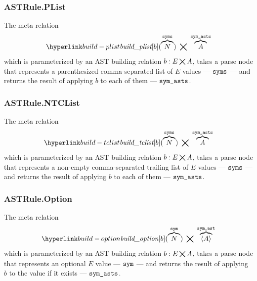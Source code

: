 \subsubsection{ASTRule.PList \label{sec:ASTRule.PList}}
\hypertarget{build-plist}{}
The meta relation
\[
\buildplist[b](\overname{N}{\vsyms}) \;\aslrel\; \overname{A}{\vsymasts}
\]
which is parameterized by an AST building relation $b : E \aslrel A$,
takes a parse node that represents a parenthesized comma-separated list of $E$ values --- $\vsyms$ --- and returns the result of applying $b$
to each of them --- $\vsymasts$.

\begin{mathpar}
\end{mathpar}

\subsubsection{ASTRule.NTCList \label{sec:ASTRule.NTCList}}
\hypertarget{build-tclist}{}
The meta relation
\[
\buildtclist[b](\overname{N}{\vsyms}) \;\aslrel\; \overname{A}{\vsymasts}
\]
which is parameterized by an AST building relation $b : E \aslrel A$,
takes a parse node that represents a non-empty comma-separated trailing list of $E$ values --- $\vsyms$ --- and returns the result of applying $b$
to each of them --- $\vsymasts$.

\begin{mathpar}
\end{mathpar}

\begin{mathpar}
\end{mathpar}

\subsubsection{ASTRule.Option \label{sec:ASTRule.Option}}
\hypertarget{build-option}{}
The meta relation
\[
\buildoption[b](\overname{N}{\vsym}) \;\aslrel\; \overname{\langle A \rangle}{\vsymast}
\]
which is parameterized by an AST building relation $b : E \aslrel A$,
takes a parse node that represents an optional $E$ value --- $\vsym$ --- and returns the result of applying $b$
to the value if it exists --- $\vsymasts$.

